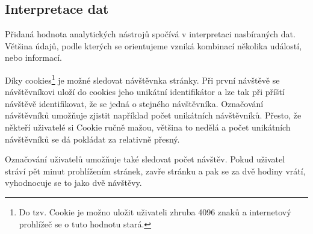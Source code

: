 \documentclass[bc,female,java,dept456]{diploma}						%
\begin{document}

\bigskip
  

\subsection{Interpretace dat}

Přidaná hodnota analytických nástrojů spočívá v interpretaci nasbíraných dat. Většina údajů, podle kterých se orientujeme vzniká kombinací několika událostí, nebo informací.

Díky cookies\footnote{Do tzv. Cookie je možno uložit uživateli zhruba 4096 znaků a internetový prohlížeč se o tuto hodnotu stará.} je možné sledovat návštěvnka stránky. Při první návštěvě se návštěvníkovi uloží do cookies jeho unikátní identifikátor a lze tak při příští návštěvě identifikovat, že se jedná o stejného návštěvníka. Označování návštěvníků umožňuje zjistit například počet unikátních návštěvníků. Přesto, že někteří uživatelé si Cookie ručně mažou, většina to nedělá a počet unikátních návštěvníků se dá pokládat za relativně přesný.

Označování uživatelů umožňuje také sledovat počet návštěv. Pokud uživatel stráví pět minut prohlížením stránek, zavře stránku a pak se za dvě hodiny vrátí, vyhodnocuje se to jako dvě návštěvy.
\end{document}
